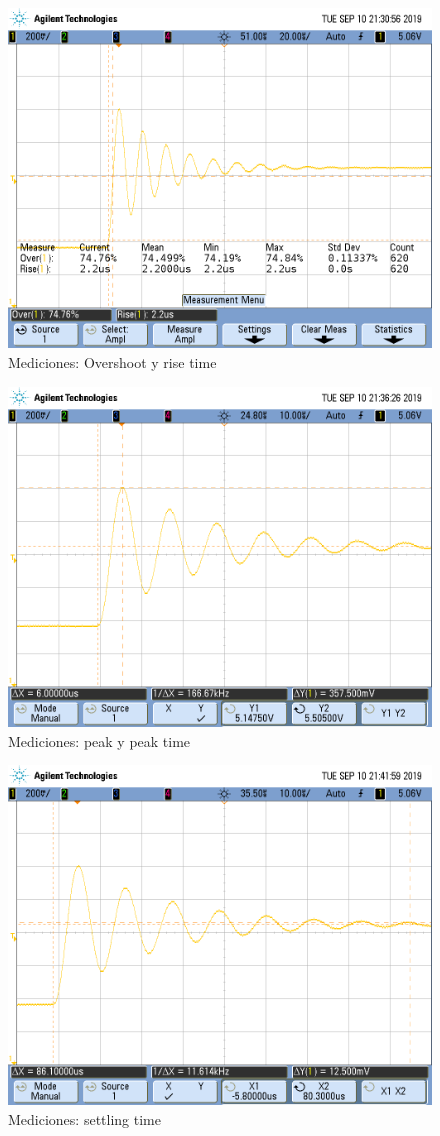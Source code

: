 \documentclass{article}
\begin{document}
\begin{figure}[H]
\centering
\includegraphics[width=0.8\linewidth]{images/os_and_trise.PNG}
\caption{Mediciones: Overshoot y rise time}
\label{fig:osandtr}
\end{figure}

\begin{figure}[H]
\centering
\includegraphics[width=0.8\linewidth]{images/tpeak_vpeak.PNG}
\caption{Mediciones: peak y peak time}
\label{fig:peak}
\end{figure}

\begin{figure}[H]
\centering
\includegraphics[width=0.8\linewidth]{images/settling_time.PNG}
\caption{Mediciones: settling time}
\label{fig:ts}
\end{figure}
\end{document}
